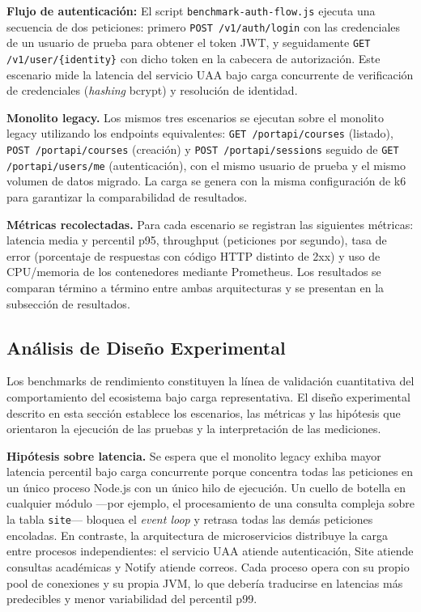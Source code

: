 \textbf{Flujo de autenticación:} El script \texttt{benchmark-auth-flow.js}
ejecuta una secuencia de dos peticiones: primero \texttt{POST /v1/auth/login} con
las credenciales de un usuario de prueba para
obtener el token JWT, y seguidamente \texttt{GET /v1/user/\{identity\}} con dicho token en
la cabecera de autorización. Este escenario mide la latencia del servicio UAA
bajo carga concurrente de verificación de credenciales (\textit{hashing} bcrypt)
y resolución de identidad.

\textbf{Monolito legacy.} Los mismos tres escenarios se ejecutan sobre el
monolito legacy utilizando los endpoints equivalentes: \texttt{GET /portapi/courses}
(listado), \texttt{POST /portapi/courses} (creación) y \texttt{POST /portapi/sessions}
seguido de \texttt{GET /portapi/users/me} (autenticación), con el mismo usuario
de prueba y el mismo volumen de datos migrado. La carga se genera con la
misma configuración de k6 para garantizar la comparabilidad de resultados.

\textbf{Métricas recolectadas.} Para cada escenario se registran las siguientes
métricas: latencia media y percentil p95, throughput (peticiones por segundo), tasa
de error (porcentaje de respuestas con código HTTP distinto de 2xx) y uso de
CPU/memoria de los contenedores mediante Prometheus. Los resultados se comparan
término a término entre ambas arquitecturas y se presentan en la subsección de
resultados.

\subsection{Análisis de Diseño Experimental}

Los benchmarks de rendimiento constituyen la línea de validación cuantitativa
del comportamiento del ecosistema bajo carga representativa. El
diseño experimental descrito en esta sección establece los escenarios, las
métricas y las hipótesis que orientaron la ejecución de las pruebas y la
interpretación de las mediciones.

\textbf{Hipótesis sobre latencia.} Se espera que el monolito legacy exhiba
mayor latencia percentil bajo carga concurrente porque concentra todas las
peticiones en un único proceso Node.js con un único hilo de ejecución. Un cuello
de botella en cualquier módulo ---por ejemplo, el procesamiento de una consulta
compleja sobre la tabla \texttt{site}--- bloquea el \textit{event loop} y
retrasa todas las demás peticiones encoladas. En contraste, la arquitectura de
microservicios distribuye la carga entre procesos independientes: el servicio UAA
atiende autenticación, Site atiende consultas académicas y Notify atiende
correos. Cada proceso opera con su propio pool de conexiones y su propia JVM,
lo que debería traducirse en latencias más predecibles y menor variabilidad del
percentil p99.

